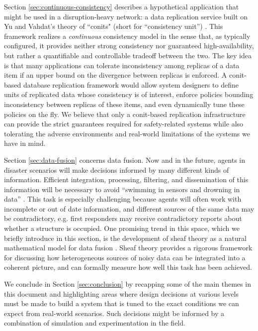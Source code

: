 \documentclass[]             %
{NASA}                       %
\theoremstyle{definition}
\begin{document}
Section \ref{sec:continuous-consistency} describes a hypothetical
application that might be used in a disruption-heavy network: a data
replication service built on Yu and Vahdat's theory of ``conits"
(short for ``consistency unit'') \cite{2002tact}. This framework
realizes a \emph{continuous} consistency model in the sense that, as
typically configured, it provides neither strong consistency nor
guaranteed high-availability, but rather a quantifiable and
controllable tradeoff between the two. The key idea is that many
applications can tolerate inconsistency among replicas of a data item
if an upper bound on the divergence between replicas is enforced. A
conit-based database replication framework would allow system
designers to define units of replicated data whose consistency is of
interest, enforce policies bounding inconsistency between replicas of
these items, and even dynamically tune these policies on the fly. We
believe that only a conit-based replication infrastructure can provide
the strict guarantees required for safety-related systems while also
tolerating the adverse environments and real-world limitations of the
systems we have in mind.

Section \ref{sec:data-fusion} concerns data fusion. Now and in the
future, agents in disaster scenarios will make decisions informed by
many different kinds of information. Efficient integration,
processing, filtering, and dissemination of this information will be
necessary to avoid ``swimming in sensors and drowning in data''
\cite{2010:magnuson}.  This task is especially challenging because
agents will often work with incomplete or out of date information, and
different sources of the same data may be contradictory, e.g. first
responders may receive contradictory reports about whether a structure
is occupied. One promising trend in this space, which we briefly
introduce in this section, is the development of sheaf theory as a
natural mathematical model for data fusion
\cite{2017robinsonCanonical}. Sheaf theory provides a rigorous
framework for discussing how heterogeneous sources of noisy data can
be integrated into a coherent picture, and can formally measure how
well this task has been achieved.

We conclude in Section \ref{sec:conclusion} by recapping some of the
main themes in this document and highlighting areas where design
decisions at various levels must be made to build a system that is
tuned to the exact conditions we can expect from real-world
scenarios. Such decisions might be informed by a combination of
simulation and experimentation in the field.
\end{document}
